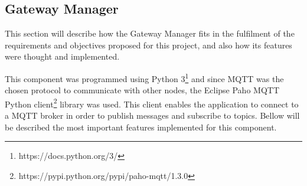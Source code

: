 \subsection{Gateway Manager}
\label{arch:gm}

This section will describe how the Gateway Manager fits in the fulfilment of the requirements and objectives proposed for this project, and also how its features were thought and implemented. 


This component was programmed using Python 3\footnote{https://docs.python.org/3/} and since MQTT was the chosen protocol to communicate with other nodes, the Eclipse Paho MQTT Python client\footnote{https://pypi.python.org/pypi/paho-mqtt/1.3.0} library was used. This client enables the application to connect to a MQTT broker in order to publish messages and subscribe to topics. Bellow will be described the most important features implemented for this component.


